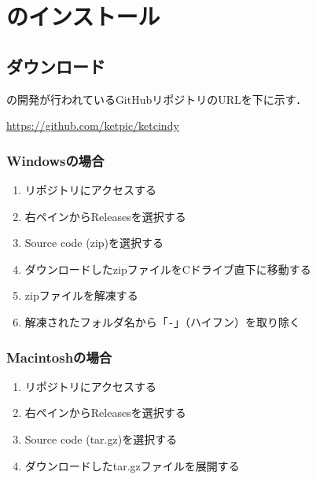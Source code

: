 
\chapter{{\ketcindy}のインストール}

\section{ダウンロード}

{\ketcindy}の開発が行われているGitHubリポジトリのURLを下に示す．
\centerline{\url{https://github.com/ketpic/ketcindy}}

\subsection{Windowsの場合}
\begin{enumerate}
    \item リポジトリにアクセスする
    \item 右ペインからReleasesを選択する
    \item Source code (zip)を選択する
    \item ダウンロードしたzipファイルをCドライブ直下に移動する
    \item zipファイルを解凍する
    \item 解凍されたフォルダ名から「\verb|-|」（ハイフン）を取り除く
\end{enumerate}

\subsection{Macintoshの場合}
\begin{enumerate}
    \item リポジトリにアクセスする
    \item 右ペインからReleasesを選択する
    \item Source code (tar.gz)を選択する
    \item ダウンロードしたtar.gzファイルを展開する
\end{enumerate}








